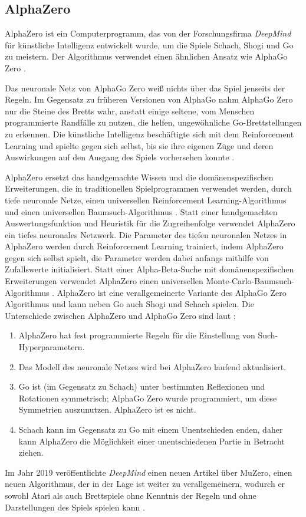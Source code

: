 \subsection{AlphaZero}
\label{secAlphaZero}
AlphaZero ist ein Computerprogramm, das von der Forschungsfirma \textit{DeepMind} für künstliche Intelligenz entwickelt wurde, um die Spiele Schach, Shogi und Go zu meistern. Der Algorithmus verwendet einen ähnlichen Ansatz wie AlphaGo Zero \cite{SilverHubert2017}. 

Das neuronale Netz von AlphaGo Zero weiß nichts über das Spiel jenseits der Regeln. Im Gegensatz zu früheren Versionen von AlphaGo nahm AlphaGo Zero nur die Steine des Bretts wahr, anstatt einige seltene, vom Menschen programmierte Randfälle zu nutzen, die helfen, ungewöhnliche Go-Brettstellungen zu erkennen. Die künstliche Intelligenz beschäftigte sich mit dem Reinforcement Learning und spielte gegen sich selbst, bis sie ihre eigenen Züge und deren Auswirkungen auf den Ausgang des Spiels vorhersehen konnte \cite{Greenemeier2017}.

AlphaZero ersetzt das handgemachte Wissen und die domänenspezifischen Erweiterungen, die in traditionellen Spielprogrammen verwendet werden, durch tiefe neuronale Netze, einen universellen Reinforcement Learning-Algorithmus und einen universellen Baumsuch-Algorithmus \cite{Silver2018}. 
Statt einer handgemachten Auswertungsfunktion und Heuristik für die Zugreihenfolge verwendet AlphaZero ein tiefes neuronales Netzwerk. Die Parameter des tiefen neuronalen Netzes in AlphaZero werden durch Reinforcement Learning trainiert, indem AlphaZero gegen sich selbst spielt, die Parameter werden dabei anfangs mithilfe von Zufallswerte initialisiert. Statt einer Alpha-Beta-Suche mit domänenspezifischen Erweiterungen verwendet AlphaZero einen universellen Monte-Carlo-Baumsuch-Algorithmus \cite{Silver2018}. AlphaZero ist eine verallgemeinerte Variante des AlphaGo Zero Algorithmus und kann neben Go auch Shogi und Schach spielen. Die Unterschiede zwischen AlphaZero und AlphaGo Zero sind laut \cite{Silver2018}:
\begin{enumerate}
	\item AlphaZero hat fest programmierte Regeln für die Einstellung von Such-Hyperparametern.
	\item Das Modell des neuronale Netzes wird bei AlphaZero laufend aktualisiert.
	\item Go ist (im Gegensatz zu Schach) unter bestimmten Reflexionen und Rotationen symmetrisch; AlphaGo Zero wurde programmiert, um diese Symmetrien auszunutzen. AlphaZero ist es nicht.
	\item Schach kann im Gegensatz zu Go mit einem Unentschieden enden, daher kann AlphaZero die Möglichkeit einer unentschiedenen Partie in Betracht ziehen.
\end{enumerate}
Im Jahr 2019 veröffentlichte \textit{DeepMind} einen neuen Artikel über MuZero, einen neuen Algorithmus, der in der Lage ist weiter zu verallgemeinern, wodurch er sowohl Atari als auch Brettspiele ohne Kenntnis der Regeln und ohne Darstellungen des Spiels spielen kann \cite{Silver2019}. 

